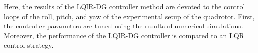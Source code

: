 \documentclass[conference]{IEEEtran}
\begin{document}
Here, the results of the LQIR-DG controller method are devoted to the control loops of the roll, pitch, and yaw of the experimental setup of the quadrotor. First, the controller parameters are tuned using the results of numerical simulations. Moreover, the performance of the LQIR-DG controller is compared to an LQR control strategy. 
\end{document}

